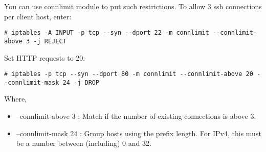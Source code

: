 You can use connlimit module to put such restrictions. To allow 3 ssh connections per client host, enter:
\begin{verbatim}
# iptables -A INPUT -p tcp --syn --dport 22 -m connlimit --connlimit-above 3 -j REJECT
\end{verbatim}

Set HTTP requests to 20:
\begin{verbatim}
# iptables -p tcp --syn --dport 80 -m connlimit --connlimit-above 20 --connlimit-mask 24 -j DROP
\end{verbatim}
Where,
\begin{itemize}
\item –connlimit-above 3 : Match if the number of existing 
connections is above 3.
\item –connlimit-mask 24 : Group hosts using the prefix length. 
For IPv4, this must be a number between (including) 0 and 32.
\end{itemize}

